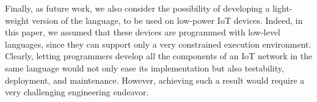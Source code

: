 Finally, as future work, we also consider the possibility of developing a
light-weight version of the language, to be used on low-power IoT devices.
Indeed, in this paper, we assumed that these devices are programmed with
low-level languages, since they can support only a very constrained execution
environment. Clearly, letting programmers develop all the components of an IoT
network in the same language would not only ease its implementation but also
testability, deployment, and maintenance. However, achieving such a result
would require a very challenging engineering endeavor.
